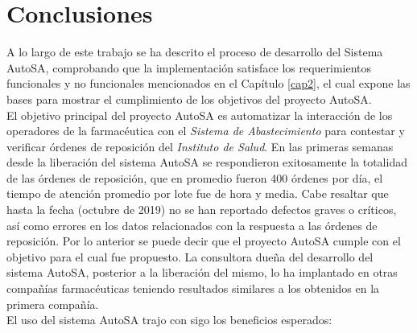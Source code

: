 \chapter{Conclusiones}\label{cap5}

A lo largo de este trabajo se ha descrito el proceso de desarrollo del Sistema AutoSA, comprobando que la implementación satisface los requerimientos funcionales y no funcionales mencionados en el Capítulo \ref{cap2}, el cual expone las bases para mostrar el cumplimiento de los objetivos del proyecto AutoSA.\\
El objetivo principal del proyecto AutoSA es automatizar la interacción de los operadores de la farmacéutica con el \textit{Sistema de Abastecimiento} para contestar y verificar órdenes de reposición del \textit{Instituto de Salud}. En las primeras semanas desde la liberación del sistema AutoSA se respondieron exitosamente la totalidad de las órdenes de reposición, que en promedio fueron 400 órdenes por día, el tiempo de atención promedio por lote fue de hora y media. Cabe resaltar que hasta la fecha (octubre de 2019) no se han reportado defectos graves o críticos, así como errores en los datos relacionados con la respuesta a las órdenes de reposición. Por lo anterior se puede decir que el proyecto AutoSA cumple con el objetivo para el cual fue propuesto. La consultora dueña del desarrollo del sistema AutoSA, posterior a la liberación del mismo, lo ha implantado en otras compañías farmacéuticas teniendo resultados similares a los obtenidos en la primera compañía.\\
El uso del sistema AutoSA trajo con sigo los beneficios esperados:
